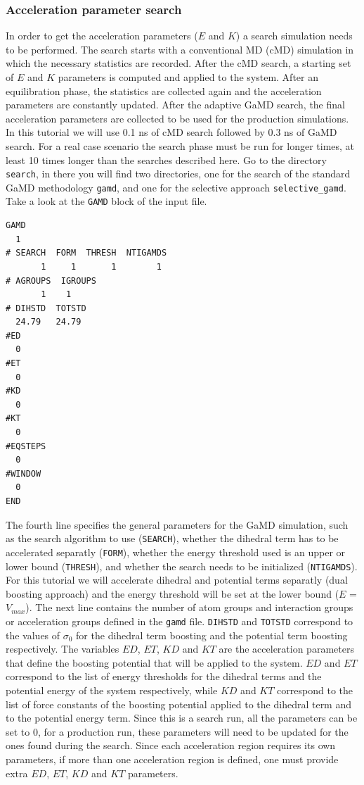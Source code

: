 \subsubsection{Acceleration parameter search}
In order to get the acceleration parameters ($E$ and $K$) a search simulation needs to be performed. The search starts with a conventional MD (cMD) simulation in which the necessary statistics are recorded. After the cMD search, a starting set of $E$ and $K$ parameters is computed and applied to the system. After an equilibration phase, the statistics are collected again and the acceleration parameters are constantly updated. After the adaptive GaMD search, the final acceleration parameters are collected to be used for the production simulations. In this tutorial we will use 0.1 ns of cMD search followed by 0.3 ns of GaMD search. For a real case scenario the search phase must be run for longer times, at least 10 times longer than the searches described here.
Go to the directory \texttt{search}, in there you will find two directories, one for the search of the standard GaMD methodology \texttt{gamd}, and one for the selective approach \texttt{selective\_gamd}. Take a look at the \texttt{GAMD} block of the input file.
\begin{lstlisting}
GAMD
  1
# SEARCH  FORM  THRESH  NTIGAMDS
       1     1       1        1
# AGROUPS  IGROUPS
       1    1
# DIHSTD  TOTSTD
  24.79   24.79
#ED
  0
#ET
  0
#KD
  0
#KT
  0
#EQSTEPS
  0
#WINDOW
  0
END
\end{lstlisting}
The fourth line specifies the general parameters for the GaMD simulation, such as the search algorithm to use (\texttt{SEARCH}), whether the dihedral term has to be accelerated separatly (\texttt{FORM}), whether the energy threshold used is an upper or lower bound (\texttt{THRESH}), and whether the search needs to be initialized (\texttt{NTIGAMDS}). For this tutorial we will accelerate dihedral and potential terms separatly (dual boosting approach) and the energy threshold will be set at the lower bound ($E$ = $V_{max}$). 
The next line contains the number of atom groups and interaction groups or acceleration groups defined in the \texttt{gamd} file.
\texttt{DIHSTD} and \texttt{TOTSTD} correspond to the values of $\sigma_0$ for the dihedral term boosting and the potential term boosting respectively.  
The variables $ED$, $ET$, $KD$ and $KT$ are the acceleration parameters that define the boosting potential that will be applied to the system. $ED$ and $ET$ correspond to the list of energy thresholds for the dihedral terms and the potential energy of the system respectively, while $KD$ and $KT$ correspond to the list of force constants of the boosting potential applied to the dihedral term and to the potential energy term. Since this is a search run, all the parameters can be set to 0, for a production run, these parameters will need to be updated for the ones found during the search. Since each acceleration region requires its own parameters, if more than one acceleration region is defined, one must provide extra $ED$, $ET$, $KD$ and $KT$ parameters.
